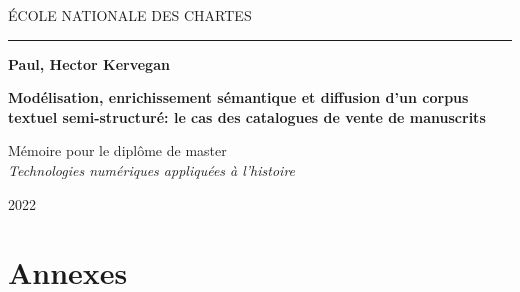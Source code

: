 \documentclass[a4paper,12pt,twoside]{book}
\newcommand{\cleartwopages}{%
	\afterpage{
		\pagestyle{empty}
		\newpage~\newpage~\newpage~
	}
}
\begin{document}
	\onehalfspacing
	
	\begin{titlepage}
		\begin{center}		
			\bigskip
			
			\begin{large}
				ÉCOLE NATIONALE DES CHARTES\\
			\end{large}
			
			\rule{2cm}{0.02cm}
			
			\begin{Large}
				\textbf{Paul, Hector Kervegan}
			\end{Large}
			
			\vfill
			
			\begin{Huge}
				\textbf{
					Modélisation, enrichissement sémantique et diffusion d'un corpus textuel
					semi-structuré: le cas des catalogues de vente de manuscrits
				}
			\end{Huge}
			
			\vfill
			
			\begin{large}
				Mémoire pour le diplôme de master \\
				\emph{Technologies numériques appliquées à l'histoire}
				
				\bigskip
				
				2022
			\end{large}
			
		\end{center}
	\end{titlepage}














\cleartwopages
\part*{Annexes}
	


\backmatter
\cleartwopages
\end{document}
